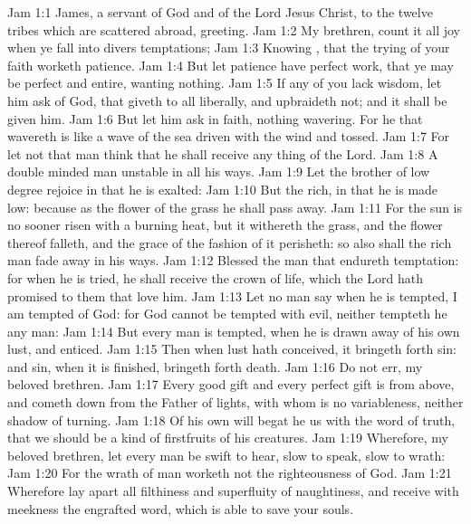 \vs Jam 1:1 James, a servant of God and of the Lord Jesus Christ, to the twelve tribes which are scattered abroad, greeting.
\vs Jam 1:2 My brethren, count it all joy when ye fall into divers temptations;
\vs Jam 1:3 Knowing , that the trying of your faith worketh patience.
\vs Jam 1:4 But let patience have  perfect work, that ye may be perfect and entire, wanting nothing.
\vs Jam 1:5 If any of you lack wisdom, let him ask of God, that giveth to all  liberally, and upbraideth not; and it shall be given him.
\vs Jam 1:6 But let him ask in faith, nothing wavering. For he that wavereth is like a wave of the sea driven with the wind and tossed.
\vs Jam 1:7 For let not that man think that he shall receive any thing of the Lord.
\vs Jam 1:8 A double minded man  unstable in all his ways.
\vs Jam 1:9 Let the brother of low degree rejoice in that he is exalted:
\vs Jam 1:10 But the rich, in that he is made low: because as the flower of the grass he shall pass away.
\vs Jam 1:11 For the sun is no sooner risen with a burning heat, but it withereth the grass, and the flower thereof falleth, and the grace of the fashion of it perisheth: so also shall the rich man fade away in his ways.
\vs Jam 1:12 Blessed  the man that endureth temptation: for when he is tried, he shall receive the crown of life, which the Lord hath promised to them that love him.
\vs Jam 1:13 Let no man say when he is tempted, I am tempted of God: for God cannot be tempted with evil, neither tempteth he any man:
\vs Jam 1:14 But every man is tempted, when he is drawn away of his own lust, and enticed.
\vs Jam 1:15 Then when lust hath conceived, it bringeth forth sin: and sin, when it is finished, bringeth forth death.
\vs Jam 1:16 Do not err, my beloved brethren.
\vs Jam 1:17 Every good gift and every perfect gift is from above, and cometh down from the Father of lights, with whom is no variableness, neither shadow of turning.
\vs Jam 1:18 Of his own will begat he us with the word of truth, that we should be a kind of firstfruits of his creatures.
\vs Jam 1:19 Wherefore, my beloved brethren, let every man be swift to hear, slow to speak, slow to wrath:
\vs Jam 1:20 For the wrath of man worketh not the righteousness of God.
\vs Jam 1:21 Wherefore lay apart all filthiness and superfluity of naughtiness, and receive with meekness the engrafted word, which is able to save your souls.
